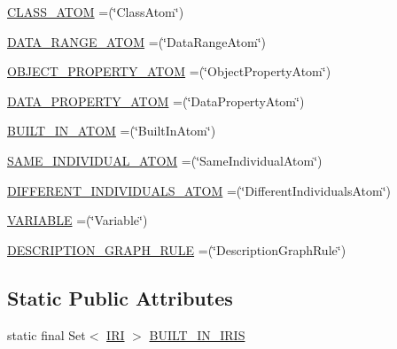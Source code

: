 \begin{DoxyCompactItemize}
\item 
\hyperlink{enumorg_1_1semanticweb_1_1owlapi_1_1vocab_1_1_o_w_l_x_m_l_vocabulary_acf6cbb1308c06afd902906aabbe01c99}{C\-L\-A\-S\-S\-\_\-\-A\-T\-O\-M} =(\char`\"{}Class\-Atom\char`\"{})
\item 
\hyperlink{enumorg_1_1semanticweb_1_1owlapi_1_1vocab_1_1_o_w_l_x_m_l_vocabulary_abc8a31b166a5a6a870f635a8896a43dc}{D\-A\-T\-A\-\_\-\-R\-A\-N\-G\-E\-\_\-\-A\-T\-O\-M} =(\char`\"{}Data\-Range\-Atom\char`\"{})
\item 
\hyperlink{enumorg_1_1semanticweb_1_1owlapi_1_1vocab_1_1_o_w_l_x_m_l_vocabulary_a95d256e613ec1ce1b93ee8e829ab1776}{O\-B\-J\-E\-C\-T\-\_\-\-P\-R\-O\-P\-E\-R\-T\-Y\-\_\-\-A\-T\-O\-M} =(\char`\"{}Object\-Property\-Atom\char`\"{})
\item 
\hyperlink{enumorg_1_1semanticweb_1_1owlapi_1_1vocab_1_1_o_w_l_x_m_l_vocabulary_ade1cbe89d5ca7b2e1d3a28e1bb5181f7}{D\-A\-T\-A\-\_\-\-P\-R\-O\-P\-E\-R\-T\-Y\-\_\-\-A\-T\-O\-M} =(\char`\"{}Data\-Property\-Atom\char`\"{})
\item 
\hyperlink{enumorg_1_1semanticweb_1_1owlapi_1_1vocab_1_1_o_w_l_x_m_l_vocabulary_a38b5f4391f0ba1828cfdbd2f2198c7a1}{B\-U\-I\-L\-T\-\_\-\-I\-N\-\_\-\-A\-T\-O\-M} =(\char`\"{}Built\-In\-Atom\char`\"{})
\item 
\hyperlink{enumorg_1_1semanticweb_1_1owlapi_1_1vocab_1_1_o_w_l_x_m_l_vocabulary_a3ab2a2623e357f8c80c58295f38db6ce}{S\-A\-M\-E\-\_\-\-I\-N\-D\-I\-V\-I\-D\-U\-A\-L\-\_\-\-A\-T\-O\-M} =(\char`\"{}Same\-Individual\-Atom\char`\"{})
\item 
\hyperlink{enumorg_1_1semanticweb_1_1owlapi_1_1vocab_1_1_o_w_l_x_m_l_vocabulary_afd7c192bd75cfe2f14e5772e0e428226}{D\-I\-F\-F\-E\-R\-E\-N\-T\-\_\-\-I\-N\-D\-I\-V\-I\-D\-U\-A\-L\-S\-\_\-\-A\-T\-O\-M} =(\char`\"{}Different\-Individuals\-Atom\char`\"{})
\item 
\hyperlink{enumorg_1_1semanticweb_1_1owlapi_1_1vocab_1_1_o_w_l_x_m_l_vocabulary_a331336ee05c5860e5b98e878f4477ac5}{V\-A\-R\-I\-A\-B\-L\-E} =(\char`\"{}Variable\char`\"{})
\item 
\hyperlink{enumorg_1_1semanticweb_1_1owlapi_1_1vocab_1_1_o_w_l_x_m_l_vocabulary_a31fa45031e28553727ca5d598292e9c7}{D\-E\-S\-C\-R\-I\-P\-T\-I\-O\-N\-\_\-\-G\-R\-A\-P\-H\-\_\-\-R\-U\-L\-E} =(\char`\"{}Description\-Graph\-Rule\char`\"{})
\end{DoxyCompactItemize}
\subsection*{Static Public Attributes}
\begin{DoxyCompactItemize}
\item 
static final Set$<$ \hyperlink{classorg_1_1semanticweb_1_1owlapi_1_1model_1_1_i_r_i}{I\-R\-I} $>$ \hyperlink{enumorg_1_1semanticweb_1_1owlapi_1_1vocab_1_1_o_w_l_x_m_l_vocabulary_a801b15f57a2437d8a52acdd0d801d8a1}{B\-U\-I\-L\-T\-\_\-\-I\-N\-\_\-\-I\-R\-I\-S}
\end{DoxyCompactItemize}
